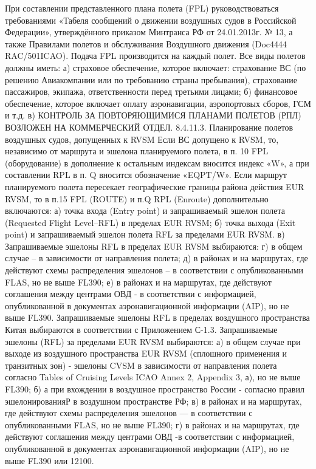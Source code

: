 При составлении представленного плана полета (FPL) руководствоваться требованиями «Табеля сообщений о движении воздушных судов в Российской Федерации», утверждённого приказом Минтранса 
РФ от 24.01.2013г. № 13, а также Правилами полетов и обслуживания Воздушного движения (Doc4444 RAC/501ICAO). Подача FPL производится на каждый полет.
Все виды полетов должны иметь:
а)	страховое обеспечение, которое включает: страхование ВС (по решению Авиакомпании или по требованию страны пребывания), страхование пассажиров, экипажа, ответственности перед третьими лицами;
б)	финансовое обеспечение, которое включает оплату аэронавигации, аэропортовых сборов, ГСМ и т.д.
в)	КОНТРОЛЬ ЗА ПОВТОРЯЮЩИМИСЯ ПЛАНАМИ ПОЛЕТОВ (РПЛ) ВОЗЛОЖЕН НА КОММЕРЧЕСКИЙ ОТДЕЛ.
8.4.11.3. Планирование полетов воздушных судов, допущенных к RVSM
Если ВС допущено к RVSM, то, независимо от маршрута и эшелона планируемого полета, в п. 10 FPL (оборудование) в дополнение к остальным индексам вносится индекс «W», а при составлении RPL в п. Q вносится обозначение «EQPT/W».
Если маршрут планируемого полета пересекает географические границы района действия EUR RVSM, то в п.15 FPL (ROUTE) и п.Q RPL (Enroute) дополнительно включаются:
а)	точка входа (Entry point) и запрашиваемый эшелон полета (Requested Flight Level–RFL) в пределах EUR RVSM;
б)	точка выхода (Exit point) и запрашиваемый эшелон полета RFL за пределами EUR RVSM.
в)	Запрашиваемые эшелоны RFL в пределах EUR RVSM выбираются:
г)	в общем случае – в зависимости от направления полета;
д)	в районах и на маршрутах, где действуют схемы распределения эшелонов – в соответствии с опубликованными FLAS, но не выше FL390;
е)	в районах и на маршрутах, где действуют соглашения между центрами ОВД - в соответствии с информацией, опубликованной в документах аэронавигационной информации (AIP), но не выше FL390.
Запрашиваемые эшелоны RFL в пределах воздушного пространства Китая выбираются в соответствии с Приложением С-1.3.
Запрашиваемые эшелоны (RFL) за пределами EUR RVSM выбираются:
а)	в общем случае при выходе из воздушного пространства EUR RVSM (сплошного применения и транзитных зон) - эшелоны CVSM в зависимости от направления полета согласно Tables of Cruising Levels ICAO Annex 2, Appendix 3, а), но не выше FL390; 
б)	а при вхождении в воздушное пространство России - согласно правил эшелонированияР в воздушном пространстве РФ;
в)	в районах и на маршрутах, где действуют схемы распределения эшелонов — в соответствии с опубликованными FLAS, но не выше FL390;
г)	в районах и на маршрутах, где действуют соглашения между центрами ОВД -в соответствии с информацией, опубликованной в документах аэронавигационной информации (AIP), но не выше FL390 или 12100. 
